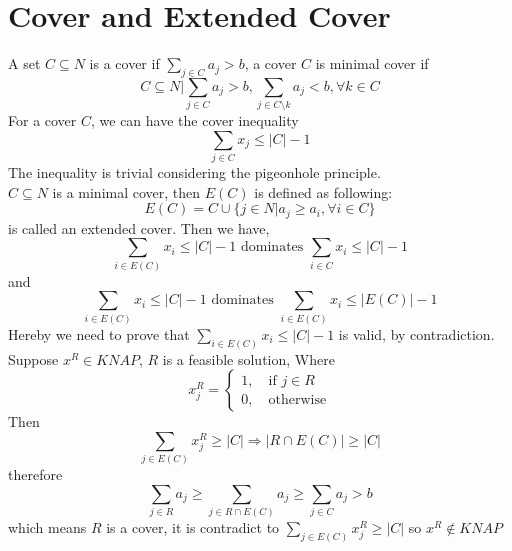 		\section{Cover and Extended Cover}
			A set $C\subseteq N$ is a cover if $\sum_{j\in C} a_j > b$, a cover $C$ is minimal cover if
			\begin{equation}
				C\subseteq N | \sum_{j\in C}a_j>b, \sum_{j\in C\setminus k} a_j < b, \forall k \in C 
			\end{equation}
			For a cover $C$, we can have the cover inequality
			\begin{equation}
				\sum_{j\in C}x_j \le |C|-1
			\end{equation}
			The inequality is trivial considering the pigeonhole principle.\\
			$C\subseteq N$ is a minimal cover, then $E(C)$ is defined as following:
			\begin{equation}
				E(C) = C\cup \{j \in N | a_j \ge a_i, \forall i \in C\}
			\end{equation}
			is called an extended cover. Then we have,
			\begin{equation}
				\sum_{i\in E(C)} x_i \le |C| - 1 \text{ dominates } \sum_{i\in C} x_i \le |C| - 1
			\end{equation}
			and
			\begin{equation}
				\sum_{i\in E(C)} x_i \le |C| - 1 \text{ dominates } \sum_{i\in E(C)} x_i \le |E(C)| - 1
			\end{equation}
			Hereby we need to prove that $\sum_{i\in E(C)} x_i \le |C| - 1$ is valid, by contradiction.\\
			 Suppose $x^R \in KNAP$, $R$ is a feasible solution, Where
			\begin{equation}
				x^R_j = \begin{cases}1, \quad \text{if $j\in R$} \\ 0, \quad \text{otherwise}\end{cases} 
			\end{equation}
			Then
			\begin{equation}
				\sum_{j\in E(C)}x^R_j \ge |C| \Rightarrow |R \cap E(C)| \ge |C|  
			\end{equation}
			therefore
			\begin{equation}
				\sum_{j\in R}a_j \ge \sum_{j\in R \cap E(C)} a_j \ge \sum_{j\in C} a_j > b 
			\end{equation}
			which means $R$ is a cover, it is contradict to $\sum_{j\in E(C)}x^R_j \ge |C|$ so $x^R \notin KNAP$

